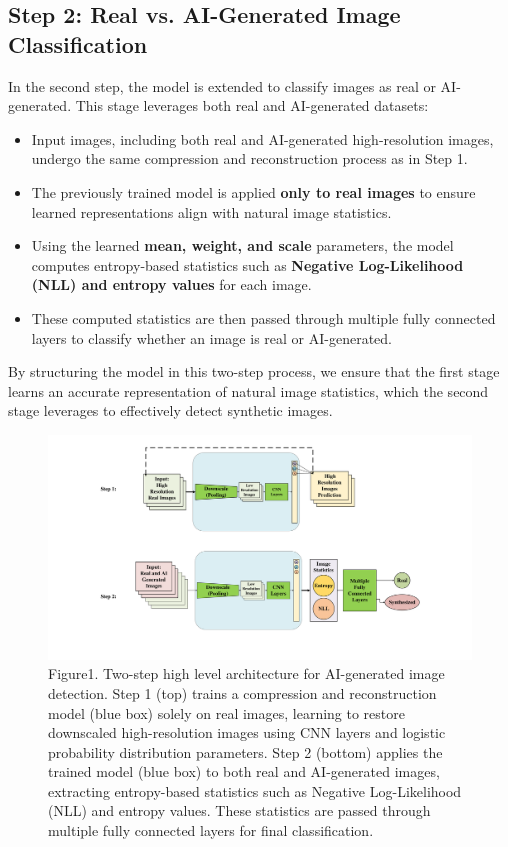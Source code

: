 \documentclass{article} %
\begin{document}
\subsection{Step 2: Real vs. AI-Generated Image Classification}
In the second step, the model is extended to classify images as real or AI-generated. This stage leverages both real and AI-generated datasets:
\begin{itemize}
    \item Input images, including both real and AI-generated high-resolution images, undergo the same compression and reconstruction process as in Step 1.
    \item The previously trained model is applied \textbf{only to real images} to ensure learned representations align with natural image statistics.
    \item Using the learned \textbf{mean, weight, and scale} parameters, the model computes entropy-based statistics such as \textbf{Negative Log-Likelihood (NLL) and entropy values} for each image.
    \item These computed statistics are then passed through multiple fully connected layers to classify whether an image is real or AI-generated.
\end{itemize}

By structuring the model in this two-step process, we ensure that the first stage learns an accurate representation of natural image statistics, which the second stage leverages to effectively detect synthetic images.

\begin{figure}[htbp]
    \centering
    \includegraphics[width=\linewidth]{Fig/high_level_architecture.pdf}
    \caption{Figure1. Two-step high level architecture for AI-generated image detection. Step 1 (top) trains a compression and reconstruction model (blue box) solely on real images, learning to restore downscaled high-resolution images using CNN layers and logistic probability distribution parameters. Step 2 (bottom) applies the trained model (blue box) to both real and AI-generated images, extracting entropy-based statistics such as Negative Log-Likelihood (NLL) and entropy values. These statistics are passed through multiple fully connected layers for final classification.}
\end{figure}
\end{document}
